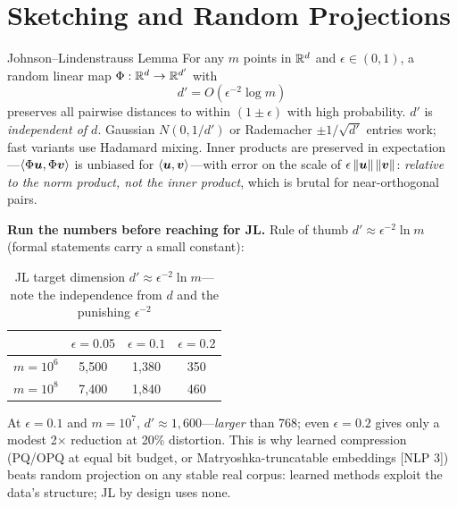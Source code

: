 \section{Sketching and Random Projections}
\label{sr:sec:vr_sketch}

\begin{mathresult}{Johnson--Lindenstrauss Lemma}
For any $m$ points in $\mathbb{R}^d$ and $\epsilon \in (0,1)$, a random linear map $\Phi: \mathbb{R}^d \to \mathbb{R}^{d'}$ with
\begin{equation}
d' = O\!\left(\epsilon^{-2} \log m\right)
\end{equation}
preserves all pairwise distances to within $(1 \pm \epsilon)$ with high probability. $d'$ is \emph{independent of $d$}. Gaussian $N(0, 1/d')$ or Rademacher $\pm 1/\sqrt{d'}$ entries work; fast variants use Hadamard mixing. Inner products are preserved in expectation---$\langle\Phi\bm{u},\Phi\bm{v}\rangle$ is unbiased for $\langle\bm{u},\bm{v}\rangle$---with error on the scale of $\epsilon \left\lVert\bm{u}\right\rVert \left\lVert\bm{v}\right\rVert$: \emph{relative to the norm product, not the inner product}, which is brutal for near-orthogonal pairs.
\end{mathresult}

\textbf{Run the numbers before reaching for JL.} Rule of thumb $d' \approx \epsilon^{-2} \ln m$ (formal statements carry a small constant):

\begin{table}[H]
\centering
\caption{JL target dimension $d' \approx \epsilon^{-2} \ln m$---note the independence from $d$ and the punishing $\epsilon^{-2}$}
\label{sr:tab:jl_sizing}
\begin{tabular}{lccc}
\toprule
 & $\epsilon = 0.05$ & $\epsilon = 0.1$ & $\epsilon = 0.2$ \\
\midrule
$m = 10^6$ & 5{,}500 & 1{,}380 & 350 \\
$m = 10^8$ & 7{,}400 & 1{,}840 & 460 \\
\bottomrule
\end{tabular}
\end{table}

At $\epsilon = 0.1$ and $m = 10^7$, $d' \approx 1{,}600$---\emph{larger} than 768; even $\epsilon = 0.2$ gives only a modest 2$\times$ reduction at 20\% distortion. This is why learned compression (PQ/OPQ at equal bit budget, or Matryoshka-truncatable embeddings [NLP 3]) beats random projection on any stable real corpus: learned methods exploit the data's structure; JL by design uses none.

